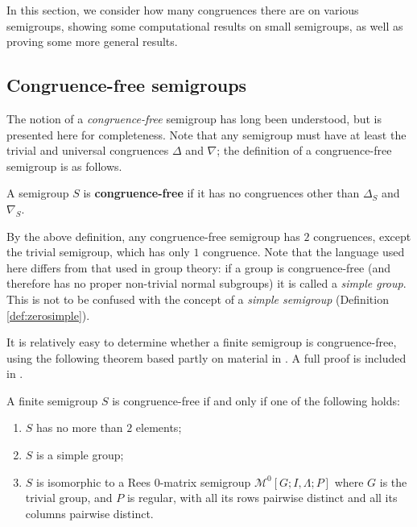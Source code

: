 In this section, we consider how many congruences there are on various
semigroups, showing some computational results on small semigroups, as well as
proving some more general results.

\subsection{Congruence-free semigroups}
\label{sec:congruence-free}

The notion of a \textit{congruence-free} semigroup has long been understood, but
is presented here for completeness.  Note that any semigroup must have at least
the trivial and universal congruences $\Delta$ and $\nabla$; the definition of
a congruence-free semigroup is as follows.

\begin{definition}
  \label{def:congruence-free}
  A semigroup $S$ is \textbf{congruence-free} if it has no congruences other
  than $\Delta_S$ and $\nabla_S$.
\end{definition}

By the above definition, any congruence-free semigroup has $2$ congruences,
except the trivial semigroup, which has only $1$ congruence.  Note that the
language used here differs from that used in group theory: if a group is
congruence-free (and therefore has no proper non-trivial normal subgroups) it is
called a \textit{simple group}.  This is not to be confused
with the concept of a \textit{simple semigroup} (Definition
\ref{def:zerosimple}).

It is relatively easy to determine whether a finite semigroup is
congruence-free, using the following theorem based partly on material in
\cite[\S3.7]{howie}.  A full proof is included in \cite[Chapter
5]{mtorpey_pre_msc}.

\begin{proposition}
  \label{prop:congruence-free}
  A finite semigroup $S$ is congruence-free if and only if one of the following
  holds:
  \begin{enumerate}[\rm(i)]
  \item $S$ has no more than $2$ elements;
  \item $S$ is a simple group;
  \item $S$ is isomorphic to a Rees 0-matrix semigroup
    $\mathcal{M}^0[G;I,\Lambda;P]$ where $G$ is the trivial group, and $P$ is
    regular, with all its rows pairwise distinct and all its columns pairwise
    distinct.
  \end{enumerate}
\end{proposition}

